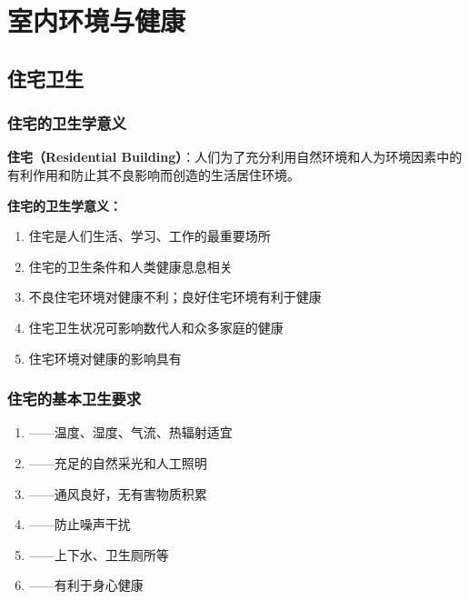 \documentclass[10pt,a4paper,oneside]{ctexbook}
\begin{document}
\newpage

\chapter{室内环境与健康}
\setcounter{chapter}{4}

\section{住宅卫生}

\subsection{住宅的卫生学意义}

\begin{defbox}
\textbf{住宅（Residential Building）}：人们为了充分利用自然环境和人为环境因素中的有利作用和防止其不良影响而创造的生活居住环境。
\end{defbox}

\textbf{住宅的卫生学意义：}
\begin{enumerate}[leftmargin=*]
    \item 住宅是人们生活、学习、工作的最重要场所
    \item 住宅的卫生条件和人类健康息息相关
    \item 不良住宅环境对健康不利；良好住宅环境有利于健康
    \item 住宅卫生状况可影响数代人和众多家庭的健康
    \item 住宅环境对健康的影响具有
\end{enumerate}

\subsection{住宅的基本卫生要求}

\begin{enumerate}[leftmargin=*]
    \item {}——温度、湿度、气流、热辐射适宜
    \item {}——充足的自然采光和人工照明
    \item {}——通风良好，无有害物质积累
    \item {}——防止噪声干扰
    \item {}——上下水、卫生厕所等
    \item {}——有利于身心健康
\end{enumerate}
\end{document}
